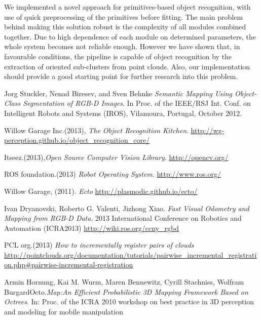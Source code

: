 \documentclass[fontsize=12pt]{article}
\begin{document}
We implemented a novel approach for primitives-based object recognition, with use of quick preprocessing of the primitives before fitting. The main problem behind making this solution robust is the complexity of all modules combined together. Due to high dependence of each module on determined parameters, the whole system becomes not reliable enough. However we have shown that, in favourable conditions, the pipeline is capable of object recognition by the extraction of oriented sub-clusters from point clouds. Also, our implementation should provide a good starting point for further research into this problem.

\begin{thebibliography}{9}

  Jorg Stuckler, Nenad Biresev, and Sven Behnke
  \emph{ Semantic Mapping Using Object-Class
Segmentation of RGB-D Images}.
  In Proc. of the IEEE/RSJ Int. Conf. on Intelligent Robots and Systems (IROS), Vilamoura, Portugal, October 2012.
  
  Willow Garage Inc.(2013), 
  \emph{The Object Recognition Kitchen}. 
  \url{http://wg-perception.github.io/object_recognition_core/}
  
  Itseez.(2013),\emph{Open Source Computer Vision Library}. 
  \url{http://opencv.org/}
  
  ROS foundation.(2013)
  \emph{Robot Operating System}.
  \url{http://www.ros.org/}
  
  Willow Garage, (2011).
  \emph{Ecto}
  \url{http://plasmodic.github.io/ecto/}
  
  Ivan Dryanovski, Roberto G. Valenti, Jizhong Xiao. \emph{Fast Visual Odometry and Mapping from RGB-D Data}. 2013 International Conference on Robotics and Automation (ICRA2013)
  \url{http://wiki.ros.org/ccny_rgbd}
  
  PCL org.(2013)
  \emph{How to incrementally register pairs of clouds}
  \url{http://pointclouds.org/documentation/tutorials/pairwise_incremental_registration.php#pairwise-incremental-registration}
  
   Armin Hornung, Kai M. Wurm, Maren Bennewitz, Cyrill Stachniss, Wolfram BurgardOcto.\emph{Map:An Efficient Probabilistic 3D Mapping Framework Based on Octrees}. In: Proc. of the ICRA 2010 workshop on best practice in 3D perception and modeling for mobile manipulation
   

\end{thebibliography}
\end{document}
